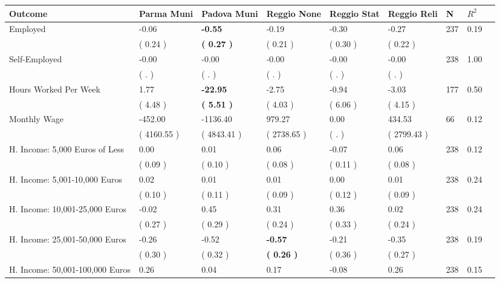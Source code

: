 \begin{tabular}{L{6.2cm} C{1.8cm} C{1.8cm} C{1.8cm} C{1.8cm} C{1.8cm} C{1.8cm} C{0.3cm} C{0.3cm}}
\toprule
 \textbf{Outcome} & \textbf{Parma Muni} & \textbf{Padova Muni} & \textbf{Reggio None} & \textbf{Reggio Stat} & \textbf{Reggio Reli} & \textbf{N} & \textbf{$ R^2$} \\
\midrule
Employed &     -0.06 & \textbf{    -0.55} &     -0.19 &     -0.30 &     -0.27  & 237 &       0.19 \\ 
 & (     0.24 ) & \textbf{(     0.27 )} & (     0.21 ) & (     0.30 ) & (     0.22 )  & \\
Self-Employed &     -0.00 &     -0.00 &     -0.00 &     -0.00 &     -0.00  & 238 &       1.00 \\ 
 & (        . ) & (        . ) & (        . ) & (        . ) & (        . )  & \\
Hours Worked Per Week &      1.77 & \textbf{   -22.95} &     -2.75 &     -0.94 &     -3.03  & 177 &       0.50 \\ 
 & (     4.48 ) & \textbf{(     5.51 )} & (     4.03 ) & (     6.06 ) & (     4.15 )  & \\
Monthly Wage &   -452.00 &  -1136.40 &    979.27 &      0.00 &    434.53  & 66 &       0.12 \\ 
 & (  4160.55 ) & (  4843.41 ) & (  2738.65 ) & (        . ) & (  2799.43 )  & \\
H. Income: 5,000 Euros of Less &      0.00 &      0.01 &      0.06 &     -0.07 &      0.06  & 238 &       0.12 \\ 
 & (     0.09 ) & (     0.10 ) & (     0.08 ) & (     0.11 ) & (     0.08 )  & \\
H. Income: 5,001-10,000 Euros &      0.02 &      0.01 &      0.01 &      0.00 &      0.01  & 238 &       0.24 \\ 
 & (     0.10 ) & (     0.11 ) & (     0.09 ) & (     0.12 ) & (     0.09 )  & \\
H. Income: 10,001-25,000 Euros &     -0.02 &      0.45 &      0.31 &      0.36 &      0.02  & 238 &       0.24 \\ 
 & (     0.27 ) & (     0.29 ) & (     0.24 ) & (     0.33 ) & (     0.24 )  & \\
H. Income: 25,001-50,000 Euros &     -0.26 &     -0.52 & \textbf{    -0.57} &     -0.21 &     -0.35  & 238 &       0.19 \\ 
 & (     0.30 ) & (     0.32 ) & \textbf{(     0.26 )} & (     0.36 ) & (     0.27 )  & \\
H. Income: 50,001-100,000 Euros &      0.26 &      0.04 &      0.17 &     -0.08 &      0.26  & 238 &       0.15 \\ 

\end{tabular}
